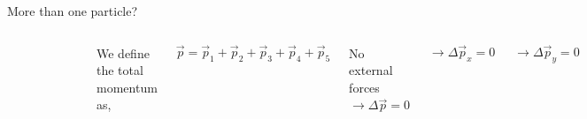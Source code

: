 \documentclass[]{beamer}
\begin{document}
\begin{frame}
More than one particle?

\vspace{3mm}

\pause


  \begin{columns}[c]
    \column{2in}  %
   
    \begin{figure}[h!]  
        \includegraphics[width=1.\textwidth]{images/3.jpg}
      
      \end{figure}

      
    \column{2in}
 


    We define the total momentum as,

\begin{equation*}
    \vec p= \vec p_1+\vec p_2+\vec p_3+\vec p_4+\vec p_5
\end{equation*}

\pause
No external forces $\rightarrow \Delta \vec p=0$

\pause


\begin{equation*}
    \rightarrow \Delta \vec p_x= 0
\end{equation*}

\begin{equation*}
    \rightarrow \Delta \vec p_y= 0
\end{equation*}


    \end{columns}




  \end{frame}
                
\end{document}
